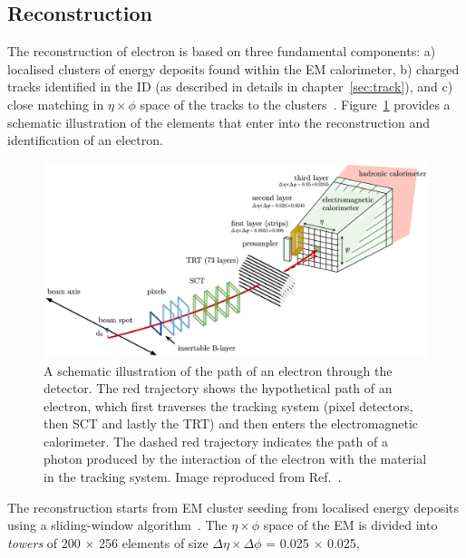 \subsection{Reconstruction}
The reconstruction of electron is based on three fundamental components: 
a) localised clusters of energy deposits found within the EM calorimeter, 
b) charged tracks identified in the ID (as described in details in chapter~\ref{sec:track}),
and c) close matching in $\eta \times \phi$ space of the tracks to the clusters~\cite{PERF-2017-01}.
Figure~\ref{fig:electron_recon} provides a schematic illustration of the elements that enter into
the reconstruction and identification of an electron. 
\begin{figure}[bht]
    \begin{centering}	
    \includegraphics[width=1.0\textwidth]{Reconstruction/plots/electron.jpg}
    \caption{A schematic illustration of the path of an electron through the detector. 
    The red trajectory shows the 
    hypothetical path of an electron, which first traverses the tracking system (pixel detectors, then SCT
    and lastly the TRT) and then enters the electromagnetic calorimeter. 
    The dashed red trajectory indicates the path of a
    photon produced by the interaction of the electron with the material in the tracking system. 
    Image reproduced from Ref.~\cite{PERF-2017-01}.
        }
    \label{fig:electron_recon}
    \end{centering}
\end{figure}
The reconstruction starts from EM cluster seeding from localised energy deposits 
using a sliding-window algorithm~\cite{sliding-window}.
The $\eta \times \phi$ space of the EM is divided into \textit{towers} of 200 $\times$ 256
elements of size $\Delta\eta \times \Delta\phi$ = 0.025 $\times$ 0.025, 
